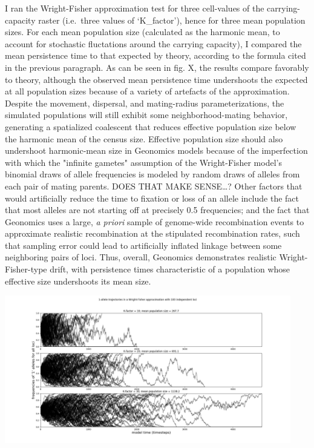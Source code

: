 ﻿\documentclass{article}
\begin{document}
I ran the Wright-Fisher approximation test for three cell-values of the
carrying-capacity raster (i.e.\ three values of `K\_factor'), hence for three mean
population sizes. For each mean population size (calculated as the harmonic mean,
to account for stochastic fluctations around the carrying capacity), I compared
the mean persistence time to that
expected by theory, according to the formula cited in the previous paragraph. As can be
seen in fig. X, the results compare favorably to theory, although the observed
mean persistence time undershoots the expected at all population sizes because of a variety
of artefacts of the approximation. Despite the movement, dispersal, and mating-radius
parameterizations, the simulated populations will still exhibit some neighborhood-mating
behavior, generating a spatialized coalescent that reduces effective population size
below the harmonic mean of the census size. 
Effective population size should also undershoot harmonic-mean size in
Geonomics models because of the imperfection with which the "infinite gametes" assumption
of the Wright-Fisher model's binomial draws of allele frequencies is modeled by
random draws of alleles from each pair of mating parents. DOES THAT MAKE SENSE\ldots? Other
factors that would artificially reduce the time to fixation or loss of an allele include
the fact that most alleles are not starting off at precisely 0.5 frequencies; and the fact
that Geonomics uses a large, \emph{a priori} sample of genome-wide recombination events
to approximate realistic recombination at the stipulated recombination rates, such that
sampling error could lead to artificially inflated linkage between some neighboring pairs
of loci. Thus, overall, Geonomics demonstrates realistic Wright-Fisher-type drift, with
persistence times characteristic of a population whose effective size undershoots its
mean size.

\includegraphics[width=125mm]{./img/validation/wf/allele_trajectories.png}
\end{document}
